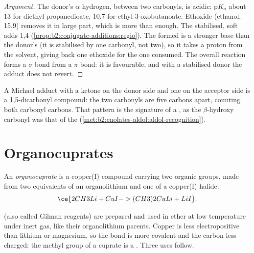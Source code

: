 \begin{proof}[Argument]
The donor's $\alpha$ hydrogen, between two carbonyls, is acidic: $\mathrm pK_a$ about 13 for diethyl
propanedioate, 10.7 for ethyl 3-oxobutanoate. Ethoxide (ethanol, 15.9) removes it in large part, which
is more than enough. The stabilised, soft  adds 1,4
(\cref{prop:b2:conjugate-additions:regio}). The  formed is a stronger base than the donor's
 (it is stabilised by one carbonyl, not two), so it takes a proton from the solvent, giving
back one ethoxide for the one consumed. The overall reaction forms a  $\sigma$ bond from a
 $\pi$ bond: it is favourable, and with a stabilised donor the adduct does not revert.
\end{proof}

A Michael adduct with a ketone on the donor side and one on the acceptor side is a 1,5-dicarbonyl
compound: the two carbonyls are five carbons apart, counting both carbonyl carbons. That pattern is the
signature of a , as the $\beta$-hydroxy carbonyl was that of the 
(\cref{met:b2:enolates-aldol:aldol-recognition}).

\section{Organocuprates}

\begin{definition}[Organocuprates]\label{def:b2:conjugate-additions:cuprate}
An \emph{organocuprate}  is a copper(I) compound carrying two organic
groups, made from two equivalents of an organolithium and one of a copper(I) halide:
\begin{equation*}
\ce{2 CH3Li + CuI -> (CH3)2CuLi + LiI}.
\end{equation*}
\end{definition}

 (also called Gilman reagents) are prepared and used in ether at low temperature under
inert gas, like their organolithium parents. Copper is less electropositive than lithium or
magnesium, so the  bond is more covalent and the carbon less charged: the methyl group of a
cuprate is a . Three uses follow.

